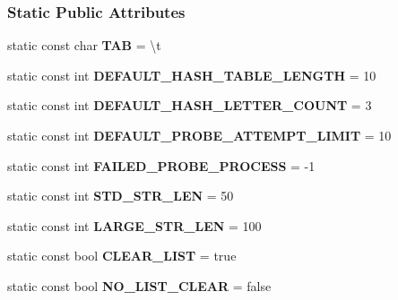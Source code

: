 \subsubsection*{Static Public Attributes}
\begin{DoxyCompactItemize}
\item 
\hypertarget{class_hash_class_a2655c7f634e469f92d94ef19ae6359a5}{}static const char {\bfseries T\+A\+B} = \textquotesingle{}\textbackslash{}t\textquotesingle{}\label{class_hash_class_a2655c7f634e469f92d94ef19ae6359a5}

\item 
\hypertarget{class_hash_class_a60d7367b79951aebdaa14160c0fd28f9}{}static const int {\bfseries D\+E\+F\+A\+U\+L\+T\+\_\+\+H\+A\+S\+H\+\_\+\+T\+A\+B\+L\+E\+\_\+\+L\+E\+N\+G\+T\+H} = 10\label{class_hash_class_a60d7367b79951aebdaa14160c0fd28f9}

\item 
\hypertarget{class_hash_class_aab488475959aa18b80d9a6da69226d91}{}static const int {\bfseries D\+E\+F\+A\+U\+L\+T\+\_\+\+H\+A\+S\+H\+\_\+\+L\+E\+T\+T\+E\+R\+\_\+\+C\+O\+U\+N\+T} = 3\label{class_hash_class_aab488475959aa18b80d9a6da69226d91}

\item 
\hypertarget{class_hash_class_a9f2bed72919e483bef385bc600ea1811}{}static const int {\bfseries D\+E\+F\+A\+U\+L\+T\+\_\+\+P\+R\+O\+B\+E\+\_\+\+A\+T\+T\+E\+M\+P\+T\+\_\+\+L\+I\+M\+I\+T} = 10\label{class_hash_class_a9f2bed72919e483bef385bc600ea1811}

\item 
\hypertarget{class_hash_class_ae1156b4f693e670a3134ca09e6ba0313}{}static const int {\bfseries F\+A\+I\+L\+E\+D\+\_\+\+P\+R\+O\+B\+E\+\_\+\+P\+R\+O\+C\+E\+S\+S} = -\/1\label{class_hash_class_ae1156b4f693e670a3134ca09e6ba0313}

\item 
\hypertarget{class_hash_class_a92c4627fdec3b4cd8cb208873278519d}{}static const int {\bfseries S\+T\+D\+\_\+\+S\+T\+R\+\_\+\+L\+E\+N} = 50\label{class_hash_class_a92c4627fdec3b4cd8cb208873278519d}

\item 
\hypertarget{class_hash_class_a820c7a9f81e841cbc5bb8d1fe1a3682a}{}static const int {\bfseries L\+A\+R\+G\+E\+\_\+\+S\+T\+R\+\_\+\+L\+E\+N} = 100\label{class_hash_class_a820c7a9f81e841cbc5bb8d1fe1a3682a}

\item 
\hypertarget{class_hash_class_a870e18392df8ea3a66b8d7bfd57238f6}{}static const bool {\bfseries C\+L\+E\+A\+R\+\_\+\+L\+I\+S\+T} = true\label{class_hash_class_a870e18392df8ea3a66b8d7bfd57238f6}

\item 
\hypertarget{class_hash_class_a0583ccea96ac8da712a40102ce1732a3}{}static const bool {\bfseries N\+O\+\_\+\+L\+I\+S\+T\+\_\+\+C\+L\+E\+A\+R} = false\label{class_hash_class_a0583ccea96ac8da712a40102ce1732a3}

\end{DoxyCompactItemize}
